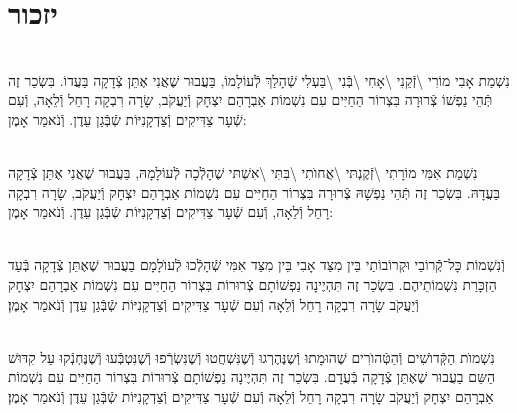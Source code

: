 \documentclass[twoside, openany, parskip=half, 11pt]{book}
\begin{document}
\vfill
{}


\sepline



\chapter[יזכור]{ יזכור }

 

\\
נִשְׁמַת אָבִי מוֹרִי \textbackslash זְֿקֵנִי \textbackslash אָחִי \textbackslash בְּֿנִי \textbackslash בַּעְלִי  שְֿׁהָלַךְ לְֿעוֹלָמוֹ, בַּעֲבוּר שֶׁאֲנִי אֶתֵּן צְֿדָקָה בַּעֲדוֹ. בִּשְׂכַר זֶה תְּֿהֵי נַפְשׁוֹ צְֿרוּרָה בִּצְרוֹר הַחַיִּים עִם נִשְׁמוֹת אַבְרָהַם יִצְחָק וְֿיַעֲקֹב, שָׂרָה רִבְקָה רָחֵל וְֿלֵאָה, וְֿעִם שְֿׁעָר צַדִּיקִים וְֿצַדְקָנִיּוֹת שְֿבְּֿגַן עֵדֶן. וְֿנֹאמַר אָמֶן:

\\
נִשְׁמַת אִמִּי מוֹרָתִי \textbackslash זְֿקֶנְתּי \textbackslash אֲחוׂתִי \textbackslash בִּתִּי \textbackslash אִשְׁתּי
שֶׁהָלְֿכָה לְֿעוֹלָמָהּ, בַּעֲבוּר שֶׁאֲנִי אֶתֵּן צְֿדָקָה בַּעֲדָהּ. בִּשְׂכַר זֶה תְּֿהֵי נַפְשָׁהּ צְֿרוּרָה בִּצְרוֹר הַחַיִּים עִם נִשְׁמוֹת אַבְרָהַם יִצְחָק וְֿיַעֲקֹב, שָׂרָה רִבְקָה רָחֵל וְֿלֵאָה, וְֿעִם שְֿׁעָר צַדִּיקִים וְֿצַדְקָנִיּוֹת שְֿבְּֿגַן עֵדֶן. וְֿנֹאמַר אָמֶן:

 \\
וְֿנִשְׁמוֹת כָּל־קְֿֿרוֹבַי וּקְרוֹבוֹתַי בֵּין מִצַּד אָבִי בֵּין מִצַּד אִמִּי
שְֿׁהָלְֿכוּ לְֿעוׂלָמָם
בַעֲבוּר שֶׁאֶתֵּן צְֿדָקָה בְּֿעַד הַזְכָּרַת נִשְׁמוֹתֵיהֶם. בִּשְׂכַר זֶה תִּהְיֶינָה נַפְשׁוֹתָם צְֿרוּרוֹת בִּצְרוֹר הַחַיִּים עִם נִשְׁמוֹת אַבְרָהַם יִצְחָק וְֿיַעֲקֹב שָׂרָה רִבְקָה רָחֵל וְֿלֵאָה וְֿעִם שְֿׁעָר צַדִּיקִים וְֿצַדְקָנִיּוֹת שְֿבְּֿגַן עֵדֶן וְֿנֹאמַר אָמֶן׃



\\
נִשְׁמוׂת הַקְּֿדוׂשִׁים וְֿהַטְּֿהוׂרִים
שֶׁהוּמָתוּ וְֿשֶנֶּהֶרְגוּ וְֿשֶׁנִּשְׁחֲטוּ וְֿשֶׁנִּשְׂרְֿפוּ וְֿשֶׁנִּטְבְּֿעוּ וְֿשֶׁנֶּחְנְֿקוּ עַל קִדּוּשׁ הַשֵּם בַעֲבוּר שֶׁאֶתֵּן צְֿדָקָה בְּֿעֲדָם. בִּשְׂכַר זֶה תִּהְיֶינָה נַפְשׁוֹתָם צְֿרוּרוֹת בִּצְרוֹר הַחַיִּים עִם נִשְׁמוֹת אַבְרָהַם יִצְחָק וְֿיַעֲקֹב שָׂרָה רִבְקָה רָחֵל וְֿלֵאָה וְֿעִם שְֿׁעָר צַדִּיקִים וְֿצַדְקָנִיּוֹת שְֿבְּֿגַן עֵדֶן וְֿנֹאמַר אָמֶן׃
%
%
%
\end{document}
